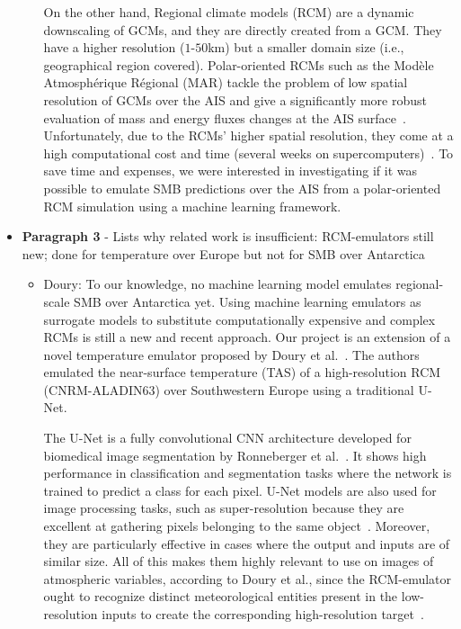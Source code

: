 \documentclass[a4paper,11pt,oneside]{report}
\begin{document}
\begin{itemize}
\begin{itemize}
        On the other hand, Regional climate models (RCM) are a dynamic downscaling of GCMs, and they are directly created from a GCM. They have a higher resolution ($1$-$50$\si{km}) but a smaller domain size (i.e., geographical region covered). Polar-oriented RCMs such as the Modèle Atmosphérique Régional (MAR) tackle the problem of low spatial resolution of GCMs over the AIS and give a significantly more robust evaluation of mass and energy fluxes changes at the AIS surface~\cite{Kittel, Fyke2018}. Unfortunately, due to the RCMs' higher spatial resolution, they come at a high computational cost and time (several weeks on supercomputers)~\cite{Doury}. To save time and expenses, we were interested in investigating if it was possible to emulate SMB predictions over the AIS from a polar-oriented RCM simulation using a machine learning framework. 
    \end{itemize}
    \item \textbf{Paragraph 3} - Lists why related work is insufficient: RCM-emulators still new; done for temperature over Europe but not for SMB over Antarctica
    \begin{itemize}
        \item Doury: To our knowledge, no machine learning model emulates regional-scale SMB over Antarctica yet. Using machine learning emulators as surrogate models to substitute computationally expensive and complex RCMs is still a new and recent approach. Our project is an extension of a novel temperature emulator proposed by Doury et al.~\cite{Doury}. The authors emulated the near-surface temperature (TAS) of a high-resolution RCM (CNRM-ALADIN63) over Southwestern Europe using a traditional U-Net. 
        
        The U-Net is a fully convolutional CNN architecture developed for biomedical image segmentation by Ronneberger et al.~\cite{Ronneberger2015}. It shows high performance in classification and segmentation tasks where the network is trained to predict a class for each pixel. U-Net models are also used for image processing tasks, such as super-resolution because they are excellent at gathering pixels belonging to the same object~\cite{Doury, howard2018fastai}. Moreover, they are particularly effective in cases where the output and inputs are of similar size. All of this makes them highly relevant to use on images of atmospheric variables, according to Doury et al., since the RCM-emulator ought to recognize distinct meteorological entities present in the low-resolution inputs to create the corresponding high-resolution target~\cite{Doury}. 
   

\end{itemize}
\end{itemize}
\end{document}
